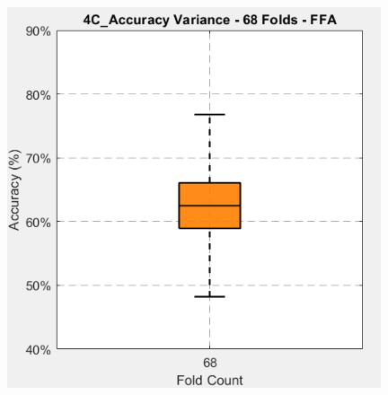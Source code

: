 \begin{frame}
\begin{columns}
		\begin{column}{0.49\textwidth}
			\begin{itemize}
			\end{itemize}
			\begin{figure}
				\centering
				\includegraphics[width=0.98\textwidth]{assets/box_4C_68_ffa.png}
			\end{figure}
		\end{column}
	\end{columns}
\end{frame}

